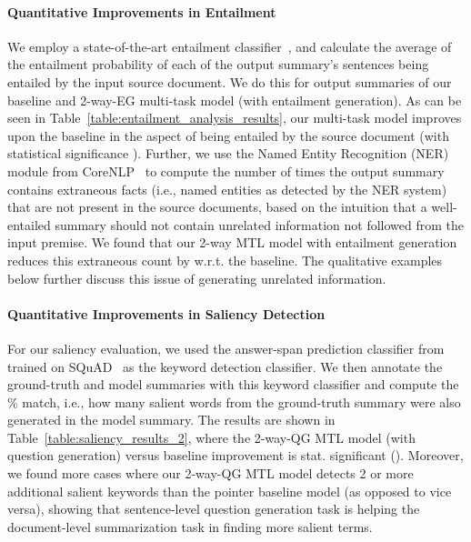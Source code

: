 \documentclass[11pt,a4paper]{article}
\begin{document}
\paragraph{Quantitative Improvements in Entailment}
We employ a state-of-the-art entailment classifier~\cite{chen2017enhanced}, and calculate the average of the entailment probability of each of the output summary's sentences being entailed by the input source document. We do this for output summaries of our baseline and 2-way-EG multi-task model (with entailment generation). As can be seen in Table~\ref{table:entailment_analysis_results}, our multi-task model improves upon the baseline in the aspect of being entailed by the source document (with statistical significance ). Further, we use the Named Entity Recognition (NER) module from CoreNLP~\cite{manning2014corenlp} to compute the number of times the output summary contains extraneous facts (i.e., named entities as detected by the NER system) that are not present in the source documents, based on the intuition that a well-entailed summary should not contain unrelated information not followed from the input premise. We found that our 2-way MTL model with entailment generation reduces this extraneous count by  w.r.t. the baseline. The qualitative examples below further discuss this issue of generating unrelated information.

\paragraph{Quantitative Improvements in Saliency Detection}
\label{para:saliency-detection}
For our saliency evaluation, we used the answer-span prediction classifier from~\citet{pasunuru2018multi} trained on SQuAD~\cite{rajpurkar2016squad} as the keyword detection classifier. We then annotate the ground-truth and model summaries with this keyword classifier and compute the \% match, i.e., how many salient words from the ground-truth summary were also generated in the model summary. The results are shown in Table~\ref{table:saliency_results_2}, where the 2-way-QG MTL model (with question generation) versus baseline improvement is stat. significant ().
Moreover, we found  more cases where our 2-way-QG MTL model detects 2 or more additional salient keywords than the pointer baseline model (as opposed to vice versa), showing that sentence-level question generation task is helping the document-level summarization task in finding more salient terms.
\end{document}
